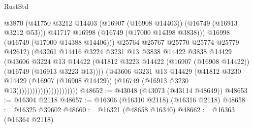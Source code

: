 \begin{lexlean}{RustStd}
\begin{coremodule}
                                              @3870
                                              (@41750
                                                @3212
                                                @14403
                                                (@16907 (@16908 @14403))
                                                (@16749 (@16913 @3212 @53)))
                                              @41717
                                              @16998
                                              (@16749 (@17000 @14398 @3838)))
                                            @16998
                                            (@16749 (@17000 @14388 @14406)))
                                          @25764
                                          @25767
                                          @25770
                                          @25774
                                          @25779
                                          @42612)
                                        (@43261
                                          @14416
                                          @3224
                                          @3231
                                          @13
                                          @3838
                                          @14422
                                          @3838
                                          @14429
                                          (@43606
                                            @3224
                                            @13
                                            @14422
                                            (@41812
                                              @3223
                                              @14422
                                              (@16907 (@16908 @14422))
                                              (@16749 (@16913 @3223 @13))))
                                          (@43606
                                            @3231
                                            @13
                                            @14429
                                            (@41812
                                              @3230
                                              @14429
                                              (@16907 (@16908 @14429))
                                              (@16749 (@16913 @3230 @13)))))))))))))))))))))))
@48652 := @43048 (@43073 (@43114 @48649))
@48653 := @16304 @2118
@48657 := @16306 (@16310 @2118) (@16316 @2118)
@48658 := @16325 @39602
@48660 := @16321 (@48658 @16340)
@48662 := @16363 (@16364 @2118)

\end{coremodule}
\end{lexlean}
